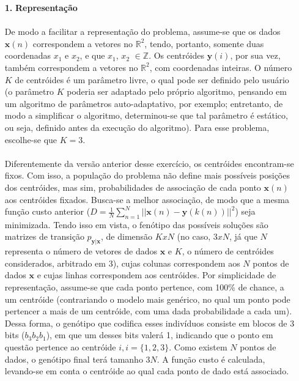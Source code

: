 \documentclass{report}
\begin{document}
\begin{itemize}

	\item[\textbf{1.}] \textbf{Representação}
	
	\paragraph{} De modo a facilitar a representação do problema, assume-se que os dados $\mathbf{x}(n)$ correspondem a vetores no $\mathbb{R}^2$, tendo, portanto, somente duas coordenadas $x_1$ e $x_2$, e que $x_1$, $x_2$ $\in \mathbb{Z}$. Os centróides $\mathbf{y}(i)$, por sua vez, também correspondem a vetores no $\mathbb{R}^2$, com coordenadas inteiras. O número $K$ de centróides é um parâmetro livre, o qual pode ser definido pelo usuário (o parâmetro $K$ poderia ser adaptado pelo próprio algoritmo, pensando em um algoritmo de parâmetros auto-adaptativo, por exemplo; entretanto, de modo a simplificar o algoritmo, determinou-se que tal parâmetro é estático, ou seja, definido antes da execução do algoritmo). Para esse problema, escolhe-se que $K = 3$.\\ 
	
	\paragraph{} Diferentemente da versão anterior desse exercício, os centróides encontram-se fixos. Com isso, a população do problema não define mais possíveis posições dos centróides, mas sim, probabilidades de associação de cada ponto $\mathbf{x}(n)$ aos centróides fixados. Busca-se a melhor associação, de modo que a mesma função custo anterior ($D = \frac{1}{N} \sum_{n = 1}^{N}||\mathbf{x}(n) - \mathbf{y}(k(n))||^2$) seja minimizada. Tendo isso em vista, o fenótipo das possíveis soluções são matrizes de transição $p_{\mathbf{y}|\mathbf{x}}$, de dimensão $KxN$ (no caso, $3xN$, já que $N$ representa o número de vetores de dados $\mathbf{x}$ e $K$, o número de centróides considerados, arbitrado em 3), cujas colunas correspondem aos $N$ pontos de dados $\mathbf{x}$ e cujas linhas correspondem aos centróides. Por simplicidade de representação, assume-se que cada ponto pertence, com 100\% de chance, a um centróide (contrariando o modelo mais genérico, no qual um ponto pode pertencer a mais de um centróide, com uma dada probabilidade a cada um). Dessa forma, o genótipo que codifica esses indivíduos consiste em blocos de 3 bits ($b_3 b_2 b_1$), em que um desses bits valerá 1, indicando que o ponto em questão pertence ao centróide $i, i = \{1,2,3\}$. Como existem $N$ pontos de dados, o genótipo final terá tamanho $3N$. A função custo é calculada, levando-se em conta o centróide ao qual cada ponto de dado está associado.\\
	

\end{itemize}
\end{document}
